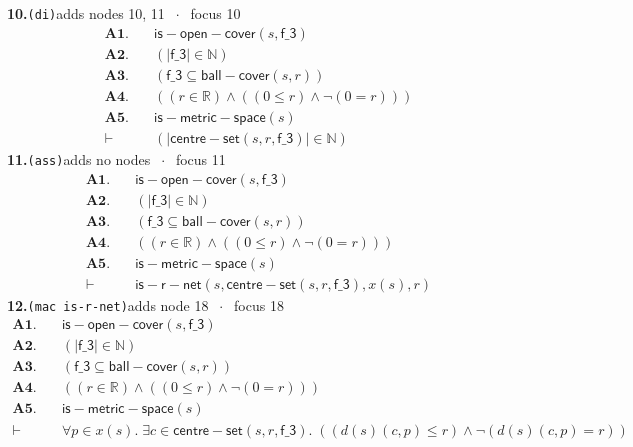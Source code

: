 \documentclass[11pt]{article}
\begin{document}
\medskip\noindent\textbf{10.}\quad \texttt{(di)}\hfill{\small adds nodes 10, 11 $\;\cdot\;$ focus 10}\\[2pt]
\begin{align*}
  \mathbf{A1.}\quad & \mathsf{is{-}open{-}cover}(s, \mathsf{f\_3}) \\
  \mathbf{A2.}\quad & (|\mathsf{f\_3}| \in \mathbb{N}) \\
  \mathbf{A3.}\quad & (\mathsf{f\_3} \subseteq \mathsf{ball{-}cover}(s, r)) \\
  \mathbf{A4.}\quad & ((r \in \mathbb{R}) \wedge ((0 \leq r) \wedge \neg (0 = r))) \\
  \mathbf{A5.}\quad & \mathsf{is{-}metric{-}space}(s) \\
  \vdash\quad & (|\mathsf{centre{-}set}(s, r, \mathsf{f\_3})| \in \mathbb{N})
\end{align*}
\medskip\noindent\textbf{11.}\quad \texttt{(ass)}\hfill{\small adds no nodes $\;\cdot\;$ focus 11}\\[2pt]
\begin{align*}
  \mathbf{A1.}\quad & \mathsf{is{-}open{-}cover}(s, \mathsf{f\_3}) \\
  \mathbf{A2.}\quad & (|\mathsf{f\_3}| \in \mathbb{N}) \\
  \mathbf{A3.}\quad & (\mathsf{f\_3} \subseteq \mathsf{ball{-}cover}(s, r)) \\
  \mathbf{A4.}\quad & ((r \in \mathbb{R}) \wedge ((0 \leq r) \wedge \neg (0 = r))) \\
  \mathbf{A5.}\quad & \mathsf{is{-}metric{-}space}(s) \\
  \vdash\quad & \mathsf{is{-}r{-}net}(s, \mathsf{centre{-}set}(s, r, \mathsf{f\_3}), x(s), r)
\end{align*}
\medskip\noindent\textbf{12.}\quad \texttt{(mac is-r-net)}\hfill{\small adds node 18 $\;\cdot\;$ focus 18}\\[2pt]
\begin{align*}
  \mathbf{A1.}\quad & \mathsf{is{-}open{-}cover}(s, \mathsf{f\_3}) \\
  \mathbf{A2.}\quad & (|\mathsf{f\_3}| \in \mathbb{N}) \\
  \mathbf{A3.}\quad & (\mathsf{f\_3} \subseteq \mathsf{ball{-}cover}(s, r)) \\
  \mathbf{A4.}\quad & ((r \in \mathbb{R}) \wedge ((0 \leq r) \wedge \neg (0 = r))) \\
  \mathbf{A5.}\quad & \mathsf{is{-}metric{-}space}(s) \\
  \vdash\quad & \forall p \in x(s).\; \exists c \in \mathsf{centre{-}set}(s, r, \mathsf{f\_3}).\; ((d(s)(c, p) \leq r) \wedge \neg (d(s)(c, p) = r))
\end{align*}
\end{document}
